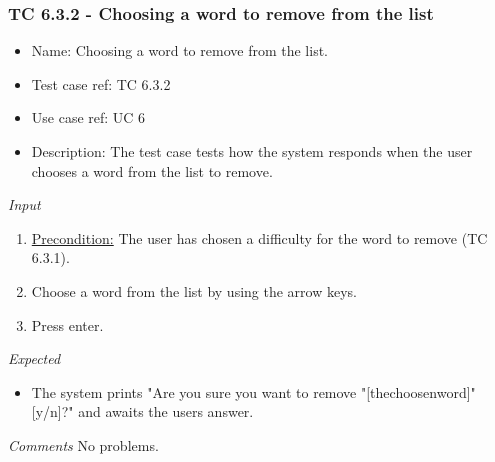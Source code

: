 \documentclass[12pt, letterpaper]{article}
\begin{document}
\subsubsection{TC 6.3.2 - Choosing a word to remove from the list}
\begin{itemize}
	\item Name: Choosing a word to remove from the list.
	\item Test case ref: TC 6.3.2
	\item Use case ref: UC 6
	\item Description: The test case tests how the system responds when the user chooses a word from the list to remove.
\end{itemize}
\emph{Input}
\begin{enumerate}
	\item \underline{Precondition:} The user has chosen a difficulty for the word to remove (TC 6.3.1).
	\item Choose a word from the list by using the arrow keys.
	\item Press enter.
\end{enumerate}
\emph{Expected}
\begin{itemize}
	\item The system prints "Are you sure you want to remove "[thechoosenword]" [y/n]?" and awaits the users answer.
\end{itemize}
\begin{Form}
	\newline
	\newline
\end{Form}
\newline
\emph{Comments}
No problems.
\end{document}
